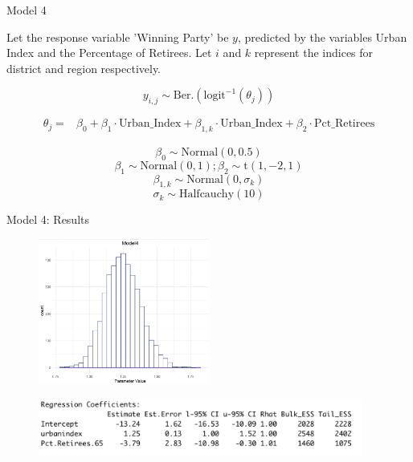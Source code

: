 \documentclass{beamer}
\begin{document}
\begin{frame}{Model 4}

    Let the response variable 'Winning Party' be \(y\), predicted by the variables Urban Index and the Percentage of Retirees. Let \(i\) and \(k\) represent the indices for district and region respectively.

    \[
    y_{i,j} \sim \text{Ber.}\left(\text{logit}^{-1}(\theta_{j})\right)
    \]

\[
\begin{aligned}
\theta_{j} =    &\beta_0 + \beta_1 \cdot \text{Urban\_Index} + \beta_{1,k} \cdot \text{Urban\_Index} + \beta_2 \cdot \text{Pct\_Retirees}
\end{aligned}
\]

    \[\beta_0 \sim \text{Normal}(0, 0.5)\]
    \[\beta_1 \sim \text{Normal}(0, 1); \beta_2 \sim \text{t}(1,-2,1)\]
    \[\beta_{1,k} \sim \text{Normal}(0, \sigma_k)\]
    \[ \sigma_k \sim \text{Halfcauchy}(10)\]
    
\end{frame}


\begin{frame}{Model 4: Results}
    \begin{figure}
        \includegraphics[width=0.5\textwidth]{plots/model4_postui.png}
    \end{figure}
    \begin{figure}
        \includegraphics[width=0.95\textwidth]{plots/model4_coeff.png}
    \end{figure}
\end{frame}
\end{document}

